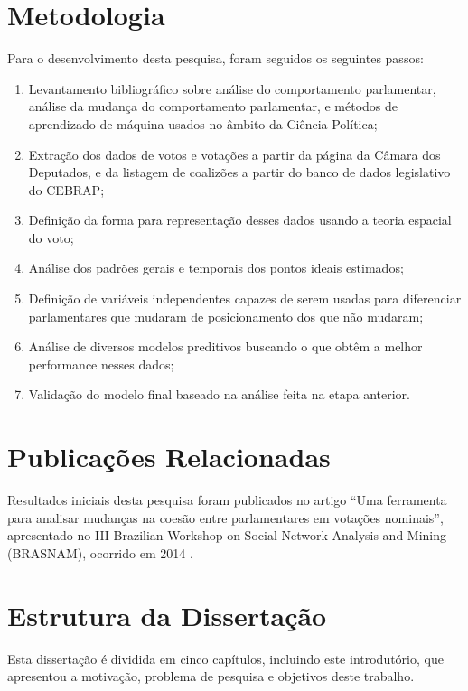 \section{Metodologia}

Para o desenvolvimento desta pesquisa, foram seguidos os seguintes passos:

\begin{enumerate}
  \item Levantamento bibliográfico sobre análise do comportamento parlamentar,
    análise da mudança do comportamento parlamentar, e métodos de aprendizado
    de máquina usados no âmbito da Ciência Política;
  \item Extração dos dados de votos e votações a partir da página da Câmara dos
    Deputados, e da listagem de coalizões a partir do banco de dados
    legislativo do \gls{CEBRAP};
  \item Definição da forma para representação desses dados usando a teoria
    espacial do voto;
  \item Análise dos padrões gerais e temporais dos pontos ideais estimados;
  \item Definição de variáveis independentes capazes de serem usadas para
    diferenciar parlamentares que mudaram de posicionamento dos que não
    mudaram;
  \item Análise de diversos modelos preditivos buscando o que obtêm a melhor
    performance nesses dados;
  \item Validação do modelo final baseado na análise feita na etapa anterior.
\end{enumerate}

\section{Publicações Relacionadas}

Resultados iniciais desta pesquisa foram publicados no artigo ``Uma ferramenta
para analisar mudanças na coesão entre parlamentares em votações nominais'',
apresentado no III Brazilian Workshop on Social Network Analysis and Mining
(BRASNAM), ocorrido em 2014 \cite{Baptista2014}.

\section{Estrutura da Dissertação}

Esta dissertação é dividida em cinco capítulos, incluindo este introdutório,
que apresentou a motivação, problema de pesquisa e objetivos deste trabalho.

